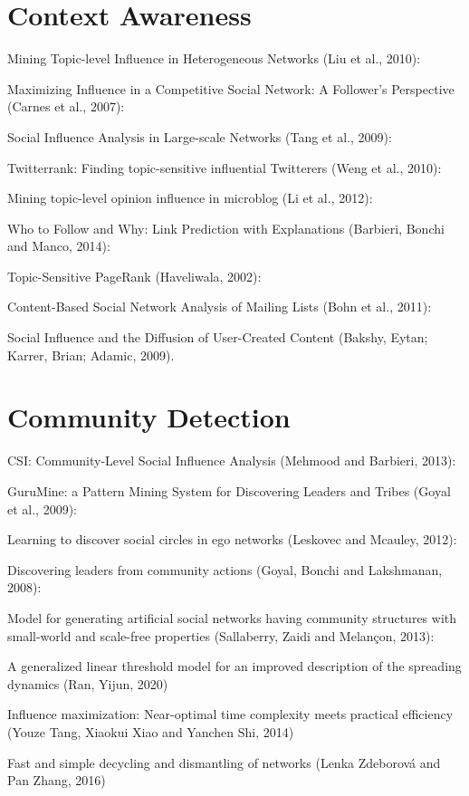 \section*{Context Awareness}

Mining Topic-level Influence in Heterogeneous Networks (Liu et al., 2010):

Maximizing Influence in a Competitive Social Network: A Follower’s Perspective (Carnes et al., 2007):

Social Influence Analysis in Large-scale Networks (Tang et al., 2009):

Twitterrank: Finding topic-sensitive influential Twitterers (Weng et al., 2010):

Mining topic-level opinion influence in microblog (Li et al., 2012):

Who to Follow and Why: Link Prediction with Explanations (Barbieri, Bonchi and Manco, 2014):

Topic-Sensitive PageRank (Haveliwala, 2002):

Content-Based Social Network Analysis of Mailing Lists (Bohn et al., 2011):

Social Influence and the Diffusion of User-Created Content (Bakshy, Eytan; Karrer, Brian; Adamic, 2009).

\section*{Community Detection}

CSI: Community-Level Social Influence Analysis (Mehmood and Barbieri, 2013):

GuruMine: a Pattern Mining System for Discovering Leaders and Tribes (Goyal et al., 2009):

Learning to discover social circles in ego networks (Leskovec and Mcauley, 2012):

Discovering leaders from community actions (Goyal, Bonchi and Lakshmanan, 2008):

Model for generating artificial social networks having community structures with small-world and scale-free properties (Sallaberry, Zaidi and Melançon, 2013):

A generalized linear threshold model for an improved description of the spreading dynamics (Ran, Yijun, 2020)

Influence maximization: Near-optimal time complexity meets practical efficiency (Youze Tang, Xiaokui Xiao and Yanchen Shi, 2014)

Fast and simple decycling and dismantling of networks (Lenka Zdeborová and Pan Zhang, 2016)

